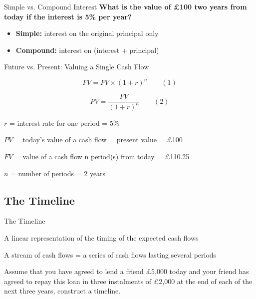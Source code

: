 \documentclass[9pt,aspectratio=169]{beamer}
\newenvironment{wideitemize}{\itemize\addtolength{\itemsep}{10pt}}{\enditemize}
\begin{document}
\begin{frame}{Simple vs. Compound Interest}
\textbf{What is the value of £100 two years from today if the interest is 5\% per year?}

\begin{itemize}
\item \textbf{Simple:} interest on the original principal only
\item \textbf{Compound:} interest on (interest + principal)
\end{itemize}

\renewcommand{\arraystretch}{1.2}
\begin{table}[h!]
\centering

\end{table}
\end{frame}

\begin{frame}{Future vs. Present: Valuing a Single Cash Flow}

$$FV = PV \times (1 + r)^n \qquad (1)$$

$$PV = \frac{FV}{(1 + r)^n} \qquad (2)$$

\begin{wideitemize}
\item $r$ = interest rate for one period = 5\%
\item $PV$ = today's value of a cash flow = present value = £100
\item $FV$ = value of a cash flow n period(s) from today = £110.25
\item $n$ = number of periods = 2 years
\end{wideitemize}
\end{frame}

\subsection{The Timeline}

\begin{frame}{The Timeline}
\begin{wideitemize}
\item A linear representation of the timing of the expected cash flows
\item A stream of cash flows = a series of cash flows lasting several periods
\item Assume that you have agreed to lend a friend £5,000 today and your friend has agreed to repay this loan in three instalments of £2,000 at the end of each of the next three years, construct a timeline.
\end{wideitemize}
\end{frame}
\end{document}
